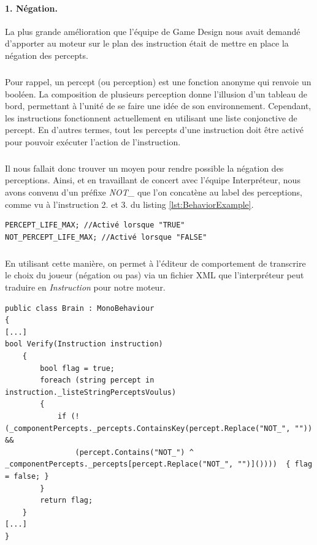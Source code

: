 \documentclass{report}
\begin{document}
\paragraph{1. Négation.}
La plus grande amélioration que l'équipe de Game Design nous avait demandé d'apporter au moteur sur le plan des instruction était de mettre en place la négation des percepts. 
\subparagraph{} Pour rappel, un percept (ou perception) est une fonction anonyme qui renvoie un booléen. La composition de plusieurs perception donne l'illusion d'un tableau de bord, permettant à l'unité de se faire une idée de son environnement. Cependant, les instructions fonctionnent actuellement en utilisant une liste conjonctive de percept. En d'autres termes, tout les percepts d'une instruction doit être activé pour pouvoir exécuter l'action de l'instruction.
\subparagraph{}Il nous fallait donc trouver un moyen pour rendre possible la négation des perceptions. Ainsi, et en travaillant de concert avec l'équipe Interpréteur, nous avons convenu d'un préfixe \textit{NOT\_} que l'on concatène au label des perceptions, comme vu à l'instruction 2. et 3. du listing \ref{lst:BehaviorExample}.
\begin{lstlisting}[label={lst:BehaviorExampleNeg}, caption = Une perception et son inverse.]
PERCEPT_LIFE_MAX; //Activé lorsque "TRUE"
NOT_PERCEPT_LIFE_MAX; //Activé lorsque "FALSE"
\end{lstlisting}

\subparagraph{}En utilisant cette manière, on permet à l'éditeur de comportement de transcrire le choix du joueur (négation ou pas) via un fichier XML que l’interpréteur peut traduire en \textit{Instruction} pour notre moteur.

\begin{lstlisting}[language={[Sharp]C},label={lst:VerifyBrainScript}, caption=  Extrait du code du script Brain.cs]
public class Brain : MonoBehaviour
{
[...]
bool Verify(Instruction instruction)
    {
        bool flag = true;
        foreach (string percept in instruction._listeStringPerceptsVoulus)
        {
            if (!(_componentPercepts._percepts.ContainsKey(percept.Replace("NOT_", "")) && 
                (percept.Contains("NOT_") ^ _componentPercepts._percepts[percept.Replace("NOT_", "")]())))  { flag = false; }
        }
        return flag;
    }
[...]
}
\end{lstlisting}
\end{document}
